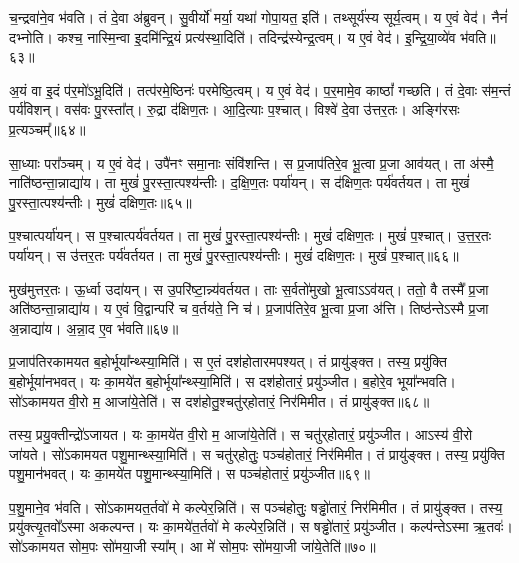 च॒न्द्रवा॑ने॒व भ॑वति।
तं दे॒वा अ॑ब्रुवन्।
सु॒वीर्यो॑ मर्या॒ यथा॑ गोपा॒यत॒ इति॑।
तथ्सूर्य॑स्य सूर्य॒त्वम्।
य ए॒वं वेद॑।
नैनं॑ दभ्नोति।
कश्च॒ नास्मि॒न्वा इ॒दमि॑न्द्रि॒यं प्रत्य॑स्था॒दिति॑।
तदिन्द्र॑स्येन्द्र॒त्वम्।
य ए॒वं वेद॑।
इ॒न्द्रि॒या॒व्ये॑व भ॑वति॥६३॥

अ॒यं वा इ॒दं प॑र॒मो॑\-ऽभू॒दिति॑।
तत्प॑रमे॒ष्ठिनः॑ परमेष्ठि॒त्वम्।
य ए॒वं वेद॑।
प॒र॒मामे॒व काष्ठां᳚ गच्छति।
तं दे॒वाः स॑म॒न्तं पर्य॑विशन्।
वस॑वः पु॒रस्ता᳚त्।
रु॒द्रा द॑क्षिण॒तः।
आ॒दि॒त्याः प॒श्चात्।
विश्वे॑ दे॒वा उ॑त्तर॒तः।
अङ्गि॑रसः प्र॒त्यञ्चम्᳚॥६४॥

सा॒ध्याः परा᳚ञ्चम्।
य ए॒वं वेद॑।
उपै॑नꣳ समा॒नाः संवि॑शन्ति।
स प्र॒जा\-प॑तिरे॒व भू॒त्वा प्र॒जा आव॑यत्।
ता अ॑स्मै॒ नाति॑ष्ठन्ता॒न्नाद्या॑य।
ता मुखं॑ पु॒रस्ता॒त्पश्य॑न्तीः।
द॒क्षि॒ण॒तः पर्या॑यन्।
स द॑क्षिण॒तः पर्य॑वर्तयत।
ता मुखं॑ पु॒रस्ता॒त्पश्य॑न्तीः।
मुखं॑ दक्षिण॒तः॥६५॥

प॒श्चात्पर्या॑यन्।
स प॒श्चात्पर्य॑वर्तयत।
ता मुखं॑ पु॒रस्ता॒त्पश्य॑न्तीः।
मुखं॑ दक्षिण॒तः।
मुखं॑ प॒श्चात्।
उ॒त्त॒र॒तः पर्या॑यन्।
स उ॑त्तर॒तः पर्य॑वर्तयत।
ता मुखं॑ पु॒रस्ता॒त्पश्य॑न्तीः।
मुखं॑ दक्षिण॒तः।
मुखं॑ प॒श्चात्॥६६॥

मुख॑मुत्तर॒तः।
ऊ॒र्ध्वा उदा॑यन्।
स उ॒परि॑ष्टा॒न्न्य॑वर्तयत।
ताः स॒र्वतो॑मुखो भू॒त्वा\-ऽऽव॑यत्।
ततो॒ वै तस्मै᳚ प्र॒जा अति॑ष्ठन्ता॒न्नाद्या॑य।
य ए॒वं वि॒द्वान्परि॑ च व॒र्तय॑ते॒ नि च॑।
प्र॒जा\-प॑तिरे॒व भू॒त्वा प्र॒जा अ॑त्ति।
तिष्ठ॑न्ते\-ऽस्मै प्र॒जा अ॒न्नाद्या॑य।
अ॒न्ना॒द ए॒व भ॑वति॥६७॥\anuvakamend[आ॒सी॒द्वेद॑ चन्द्रम॒स्त्वं य ए॒वं वेदे᳚न्द्रिया॒व्ये॑व भ॑वति प्र॒त्यञ्चं॒ मुखं॑ दक्षिण॒तो मुखं॑ प॒श्चान्नव॑ च]

प्र॒जा\-प॑तिरकामयत ब॒होर्भूया᳚न्थ्स्या॒मिति॑।
स ए॒तं दश॑होतारमपश्यत्।
तं प्रायु॑ङ्क्त।
तस्य॒ प्रयु॑क्ति ब॒होर्भूया॑नभवत्।
यः का॒मये॑त ब॒होर्भूया᳚न्थ्स्या॒मिति॑।
स दश॑होतारं॒ प्रयु॑ञ्जीत।
ब॒होरे॒व भूया᳚न्भवति।
सो॑ऽकामयत वी॒रो म॒ आजा॑ये॒तेति॑।
स दश॑होतु॒श्चतु॑र्‌\mbox{}होतारं॒ निर॑मिमीत।
तं प्रायु॑ङ्क्त॥६८॥

तस्य॒ प्रयु॒क्तीन्द्रो॑\-ऽजायत।
यः का॒मये॑त वी॒रो म॒ आजा॑ये॒तेति॑।
स चतु॑र्‌\mbox{}होतारं॒ प्रयु॑ञ्जीत।
आऽस्य॑ वी॒रो जा॑यते।
सो॑ऽकामयत पशु॒मान्थ्स्या॒मिति॑।
स चतु॑र्‌\mbox{}होतुः॒ पञ्च॑होतारं॒ निर॑मिमीत।
तं प्रायु॑ङ्क्त।
तस्य॒ प्रयु॑क्ति पशु॒मान॑भवत्।
यः का॒मये॑त पशु॒मान्थ्स्या॒मिति॑।
स पञ्च॑होतारं॒ प्रयु॑ञ्जीत॥६९॥

प॒शु॒माने॒व भ॑वति।
सो॑ऽकामयत॒र्तवो॑ मे कल्पेर॒न्निति॑।
स पञ्च॑होतुः॒ षड्ढो॑तारं॒ निर॑मिमीत।
तं प्रायु॑ङ्क्त।
तस्य॒ प्रयु॑क्त्यृ॒तवो᳚\-ऽस्मा अकल्पन्त।
यः का॒मये॑त॒र्तवो॑ मे कल्पेर॒न्निति॑।
स षड्ढो॑तारं॒ प्रयु॑ञ्जीत।
कल्प॑न्ते\-ऽस्मा ऋ॒तवः॑।
सो॑ऽकामयत सोम॒पः सो॑मया॒जी स्या᳚म्।
आ मे॑ सोम॒पः सो॑मया॒जी जा॑ये॒तेति॑॥७०॥

